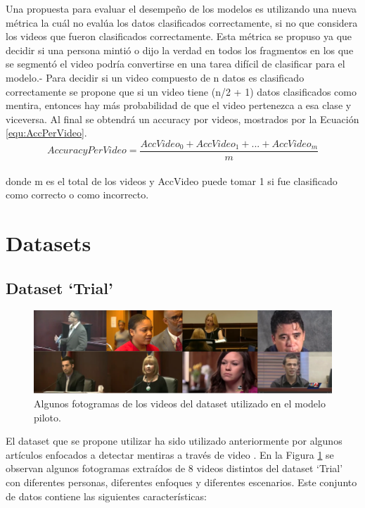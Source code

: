\begin{onehalfspacing}
Una propuesta para evaluar el desempeño de los modelos es utilizando una nueva métrica la cuál no evalúa los datos clasificados correctamente, si no que considera los videos que fueron clasificados correctamente. Esta métrica se propuso ya que decidir si una persona mintió o dijo la verdad en todos los fragmentos en los que se segmentó el video podría convertirse en una tarea difícil de clasificar para el modelo.- Para decidir si un video compuesto de n datos es clasificado correctamente se propone que si un video tiene (n/2 + 1) datos clasificados como mentira, entonces hay más probabilidad de que el video pertenezca a esa clase y viceversa.
Al final se obtendrá un accuracy por videos, mostrados por la Ecuación \ref{equ:AccPerVideo}.\\

\begin{equation}
\label{equ:AccPerVideo}
    AccuracyPerVideo = \frac{AccVideo_{0} + AccVideo_{1} + ... + AccVideo_{m}}{m}
\end{equation}\\

donde m es el total de los videos y AccVideo puede tomar 1 si fue clasificado como correcto o como incorrecto.


\section{Datasets}
\label{sec:Datasets}

\subsection{Dataset `Trial'}
\label{sec:Dataset-Trial}

\begin{figure}[th]
	\centering
	\includegraphics[width=17cm,keepaspectratio]{XX_Figures/Fig_Dataset1.png}
	\caption{\footnotesize Algunos fotogramas de los videos del dataset utilizado en el modelo piloto.}
	\label{fig:Fig_Dataset1}
\end{figure}

El dataset que se propone utilizar ha sido utilizado anteriormente por algunos artículos enfocados a detectar mentiras a través de video \cite{Perez-Rosas2015VerbalDetection,Wu2018DeceptionVideos,KrishnamurthyADetection}. En la Figura \ref{fig:Fig_Dataset1} se observan algunos fotogramas extraídos de 8 videos distintos del dataset `Trial' con diferentes personas, diferentes enfoques y diferentes escenarios. Este conjunto de datos contiene las siguientes características:\\


\end{onehalfspacing}
